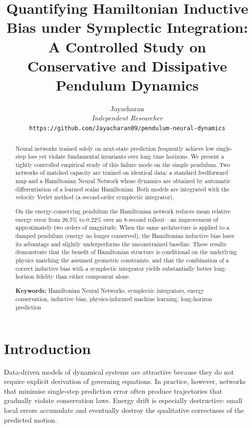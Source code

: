 \documentclass[11pt,a4paper]{article}
\title{%
Quantifying Hamiltonian Inductive Bias under Symplectic Integration:\\
A Controlled Study on Conservative and Dissipative Pendulum Dynamics
}
\author{%
Jayacharan\\
\textit{Independent Researcher}\\
\texttt{https://github.com/Jayacharan09/pendulum-neural-dynamics}
}
\date{}
\begin{document}
\maketitle

\begin{abstract}
Neural networks trained solely on next-state prediction frequently achieve low single-step loss yet violate fundamental invariants over long time horizons. We present a tightly controlled empirical study of this failure mode on the simple pendulum. Two networks of matched capacity are trained on identical data: a standard feedforward map and a Hamiltonian Neural Network whose dynamics are obtained by automatic differentiation of a learned scalar Hamiltonian. Both models are integrated with the velocity Verlet method (a second-order symplectic integrator).

On the energy-conserving pendulum the Hamiltonian network reduces mean relative energy error from 26.5\% to 0.22\% over an 8-second rollout---an improvement of approximately two orders of magnitude. When the same architecture is applied to a damped pendulum (energy no longer conserved), the Hamiltonian inductive bias loses its advantage and slightly underperforms the unconstrained baseline. These results demonstrate that the benefit of Hamiltonian structure is conditional on the underlying physics matching the assumed geometric constraints, and that the combination of a correct inductive bias with a symplectic integrator yields substantially better long-horizon fidelity than either component alone.

\vspace{0.5em}
\noindent\textbf{Keywords:} Hamiltonian Neural Networks, symplectic integrators, energy conservation, inductive bias, physics-informed machine learning, long-horizon prediction
\end{abstract}

\section{Introduction}

Data-driven models of dynamical systems are attractive because they do not require explicit derivation of governing equations. In practice, however, networks that minimise single-step prediction error often produce trajectories that gradually violate conservation laws. Energy drift is especially destructive: small local errors accumulate and eventually destroy the qualitative correctness of the predicted motion.
\end{document}
